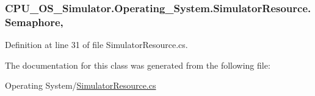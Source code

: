 \subsubsection[{Semaphore}]{ C\+P\+U\+\_\+\+O\+S\+\_\+\+Simulator.\+Operating\+\_\+\+System.\+Simulator\+Resource.\+Semaphore\hspace{0.3cm}{\ttfamily [get]}, {\ttfamily [set]}}\label{class_c_p_u___o_s___simulator_1_1_operating___system_1_1_simulator_resource_a4d036101fc7fe264c6b7a4533def8cfe}


Definition at line 31 of file Simulator\+Resource.\+cs.



The documentation for this class was generated from the following file\+:\begin{DoxyCompactItemize}
\item 
Operating System/\hyperlink{_simulator_resource_8cs}{Simulator\+Resource.\+cs}\end{DoxyCompactItemize}
